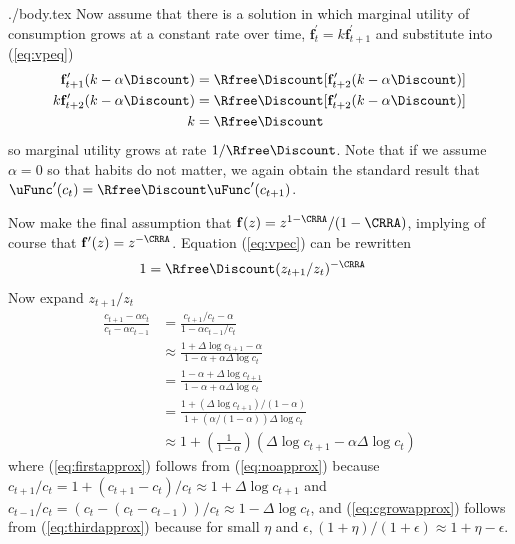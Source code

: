 \documentclass{handout}
\begin{document}
\begin{verbatimwrite}{./body.tex}
Now assume that there is a solution in which marginal utility of 
consumption grows at a constant rate over time, $\mathbf{f}_{t}^{\prime}=k 
\mathbf{f}_{t+1}^{\prime}$ and substitute into (\ref{eq:vpeq})
\begin{equation}\begin{gathered}\begin{aligned}
        \mathbf{f}_{t+1}^{\prime}(k-\alpha \Discount) & =  \Rfree\Discount[\mathbf{f}_{t+2}^{\prime}(k-\alpha \Discount)] \label{eq:vpec}
\\      k \mathbf{f}_{t+2}^{\prime}(k-\alpha \Discount) & =  \Rfree\Discount[\mathbf{f}_{t+2}^{\prime}(k-\alpha \Discount)] 
\\  k & =  \Rfree\Discount 
\end{aligned}\end{gathered}\end{equation}
so marginal utility grows at rate $1/\Rfree\Discount$.  Note 
that if we assume $\alpha=0$ so that habits do not matter, we again obtain
the standard result that $\uFunc^{\prime}(c_{t}) = \Rfree\Discount \uFunc^{\prime}(c_{t+1})$.

Now make the final assumption that $\mathbf{f}(z) = z^{1-\CRRA}/(1-\CRRA)$, implying
of course that $\mathbf{f}^{\prime}(z) = z^{-\CRRA}$.  Equation (\ref{eq:vpec}) can be rewritten
\begin{equation}\begin{gathered}\begin{aligned}
        1 & =  \Rfree\Discount (z_{t+1}/z_{t})^{-\CRRA} \label{eq:zfoc}
\end{aligned}\end{gathered}\end{equation}
Now expand $z_{t+1}/z_{t}$
\begin{align}
   \frac{c_{t+1}-\alpha c_{t}}{c_{t}-\alpha c_{t-1}} & =  \frac{c_{t+1}/c_{t}-\alpha}{1-\alpha c_{t-1}/c_{t}} \label{eq:noapprox}
\\ & \approx  \frac{1+\Delta \log c_{t+1}-\alpha}{1 - \alpha + \alpha \Delta \log c_{t}} \label{eq:firstapprox}
\\ & =  \frac{1-\alpha+\Delta \log c_{t+1}}{1 - \alpha + \alpha \Delta \log c_{t}} \label{eq:secondapprox}
\\ & =  \frac{1+(\Delta \log c_{t+1})/(1-\alpha)}{1 + (\alpha/(1-\alpha)) \Delta \log c_{t}} \label{eq:thirdapprox}
\\ & \approx  1+\left(\frac{1}{1-\alpha}\right)\left(\Delta \log c_{t+1} - \alpha \Delta \log c_{t} \label{eq:cgrowapprox} \right)
\end{align}
where (\ref{eq:firstapprox}) follows from (\ref{eq:noapprox}) because 
$c_{t+1}/c_{t} = 1+(c_{t+1}-c_{t})/c_{t} \approx 1+\Delta \log 
c_{t+1}$ and $c_{t-1}/c_{t} = (c_{t}-(c_{t}-c_{t-1}))/c_{t} \approx 1 
- \Delta \log c_{t}$, and (\ref{eq:cgrowapprox}) follows from 
(\ref{eq:thirdapprox}) because for small $\eta$ and $\epsilon, (1+\eta)/(1+\epsilon) 
\approx 1+\eta-\epsilon$.


\end{verbatimwrite}
\end{document}
